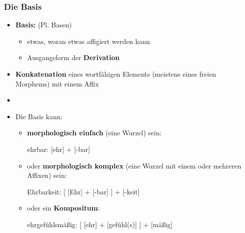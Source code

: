 \begin{frame}
\frametitle{Die Basis}

\begin{itemize}
	\item \textbf{Basis:} (Pl. Basen)
	
	\begin{itemize}
		\item etwas, woran etwas affigiert werden kann
		\item Ausgangsform der \textbf{Derivation}
	\end{itemize}
	
	\item \textbf{Konkatenation} eines wortfähigen Elements (meistens eines freien Morphems) mit einem Affix
	\item[]
	\item Die Basis kann:
	
	\begin{itemize}
		\item \textbf{morphologisch einfach} (eine Wurzel) sein:
		
		\ea ehrbar: [ehr] + [-bar]
		\z
		
		\item oder \textbf{morphologisch komplex} (eine Wurzel mit einem oder mehreren Affixen) sein:
		
		\ea Ehrbarkeit: [ [Ehr] + [-bar] ] + [-keit]
		\z
		
		\item oder ein \textbf{Kompositum}:
		
		\ea ehrgefühlsmäßig: [ [ehr] + [gefühl(s)] ] + [mäßig]
		\z
		
	\end{itemize}
	
\end{itemize}


\end{frame}




